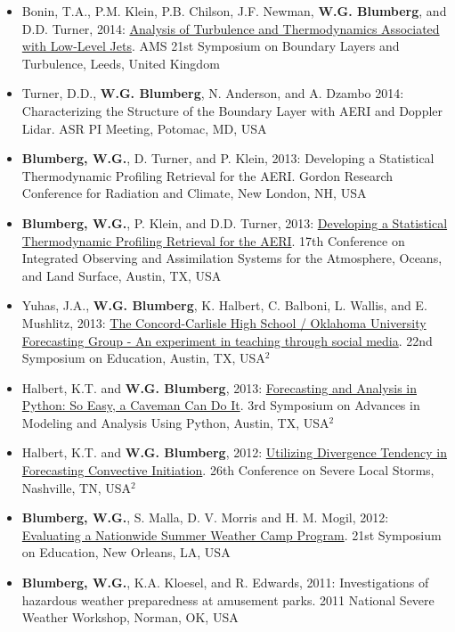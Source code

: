 \documentclass[10pt]{res} %
\begin{document}
\begin{resume}
\begin{itemize}
\item Bonin, T.A., P.M. Klein, P.B. Chilson, J.F. Newman, \textbf{W.G. Blumberg}, and D.D. Turner, 2014: \href{https://ams.confex.com/ams/21BLT/webprogram/Paper248197.html}{Analysis of Turbulence and Thermodynamics Associated with Low-Level Jets}. AMS 21st Symposium on Boundary Layers and Turbulence, Leeds, United Kingdom
\item Turner, D.D., \textbf{W.G. Blumberg}, N. Anderson, and A. Dzambo  2014: Characterizing the Structure of the Boundary Layer with AERI and Doppler Lidar. ASR PI Meeting, Potomac, MD, USA
\item \textbf{Blumberg, W.G.}, D. Turner, and P. Klein, 2013: Developing a Statistical Thermodynamic Profiling Retrieval for the AERI. Gordon Research Conference for Radiation and Climate, New London, NH, USA
\item \textbf{Blumberg, W.G.}, P. Klein, and D.D. Turner, 2013: \href{https://ams.confex.com/ams/93Annual/webprogram/Paper217725.html}{Developing a Statistical Thermodynamic Profiling Retrieval for the AERI}. 17th Conference on Integrated Observing and Assimilation Systems for the Atmosphere, Oceans, and Land Surface, Austin, TX, USA 
\item Yuhas, J.A., \textbf{W.G. Blumberg}, K. Halbert, C. Balboni, L. Wallis, and E. Mushlitz, 2013: \href{https://ams.confex.com/ams/93Annual/webprogram/Paper221498.html}{The Concord-Carlisle High School / Oklahoma University Forecasting Group - An experiment in teaching through social media}. 22nd Symposium on Education, Austin, TX, USA$^{2}$
\item Halbert, K.T. and \textbf{W.G. Blumberg}, 2013: \href{https://ams.confex.com/ams/93Annual/webprogram/Paper213476.html}{Forecasting and Analysis in Python: So Easy, a Caveman Can Do It}. 3rd Symposium on Advances in Modeling and Analysis Using Python, Austin, TX, USA$^{2}$
\item Halbert, K.T. and \textbf{W.G. Blumberg}, 2012: \href{https://ams.confex.com/ams/26SLS/webprogram/Paper211764.html}{Utilizing Divergence Tendency in Forecasting Convective Initiation}. 26th Conference on Severe Local Storms, Nashville, TN, USA$^{2}$
\item \textbf{Blumberg, W.G.}, S. Malla, D. V. Morris and H. M. Mogil, 2012: \href{https://ams.confex.com/ams/92Annual/webprogram/Paper202144.html}{Evaluating a Nationwide Summer Weather Camp Program}. 21st Symposium on Education, New Orleans, LA, USA
\item \textbf{Blumberg, W.G.}, K.A. Kloesel, and R. Edwards, 2011: Investigations of hazardous weather preparedness at amusement parks. 2011 National Severe Weather Workshop, Norman, OK, USA

\end{itemize}
\end{resume}
\end{document}
